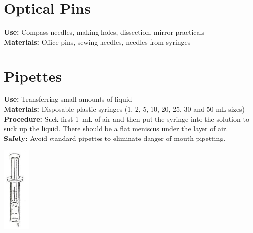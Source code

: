 \begin{multicols}{2}
\section{Optical Pins}
\label{sec:optical-pins}
\vspace{-10pt}
\textbf{Use:} Compass needles, making holes, dissection, mirror practicals\\
\textbf{Materials:} Office pins, sewing needles, needles from syringes

\section{Pipettes}
\label{sec:pipettes}
\vspace{-10pt}
\textbf{Use:} Transferring small amounts of liquid\\
\textbf{Materials:} Disposable plastic syringes (1, 2, 5, 10, 20, 25, 30 and 50 mL sizes)\\
\textbf{Procedure:} Suck first 1~mL of air and then put the syringe into the solution to suck up the liquid. There should be a flat meniscus under the layer of air.\\
\textbf{Safety:} Avoid standard pipettes to eliminate danger of mouth pipetting.
\begin{center}
\includegraphics[width=0.1\textwidth]{./img/source/syringe.jpg}
\end{center}


\end{multicols}

